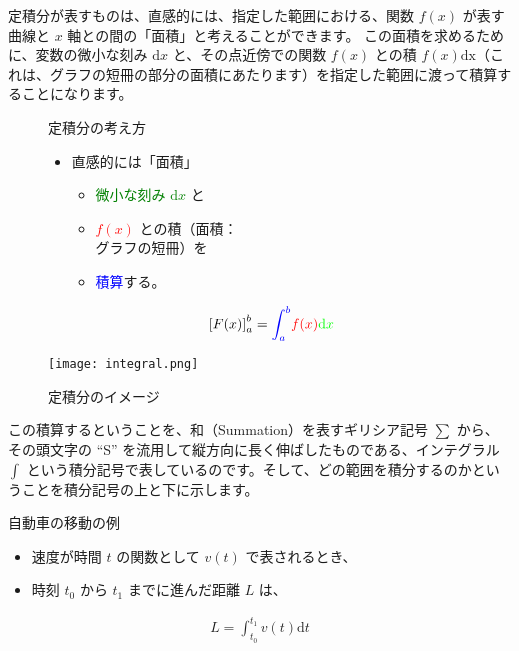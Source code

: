 \documentclass[uplatex,dvipdfmx,a4paper,11pt]{jsarticle}
\begin{document}
定積分が表すものは、直感的には、指定した範囲における、関数 $f(x)$ が表す曲線と $x$ 軸との間の「面積」と考えることができます。
この面積を求めるために、変数の微小な刻み $\mathrm{d} x$ と、その点近傍での関数 $f(x)$ との積 $f(x) \mathrm{dx}$（これは、グラフの短冊の部分の面積にあたります）を指定した範囲に渡って積算することになります。
\begin{figure}[htb]
	\begin{center}
		\begin{minipage}{0.45\textwidth}
			\large
			\begin{itembox}[l]{定積分の考え方}
				\begin{itemize}
					\item 直感的には「面積」
					\begin{itemize}
						\item \textcolor{green}{微小な刻み $\mathrm{d} x$} と
						\item \textcolor{red}{$f(x)$} との積（面積：\\グラフの短冊）を
						\item \textcolor{blue}{積算}する。
					\end{itemize}
					\vspace{-3mm}
					\small
					\begin{align*}
						\left[ F(x) \right]_a^b = \textcolor{blue}{\int_a^b} \textcolor{red}{f(x)} \textcolor{green}{\mathrm{d} x}
					\end{align*}
				\end{itemize}
			\end{itembox}
		\end{minipage}
		\begin{minipage}{0.45\textwidth}
			\begin{center}
			\texttt{[image: integral.png]}
			\end{center}
		\end{minipage}
		\caption{定積分のイメージ}
		\label{sekibun}
	\end{center}
\end{figure}

この積算するということを、和（Summation）を表すギリシア記号 $\sum$ から、その頭文字の ``S'' を流用して縦方向に長く伸ばしたものである、インテグラル $\int$ という積分記号で表しているのです。そして、どの範囲を積分するのかということを積分記号の上と下に示します。
\large
\begin{itembox}[l]{自動車の移動の例}
	\begin{itemize}
		\item 速度が時間 $t$ の関数として $v(t)$ で表されるとき、
		\item 時刻 $t_0$ から $t_1$ までに進んだ距離 $L$ は、
	\end{itemize} 
	\begin{align*}
		L=\int_{t_0}^{t_1} v(t) \mathrm{d} t
	\end{align*}
\end{itembox}
\normalsize
\end{document}
